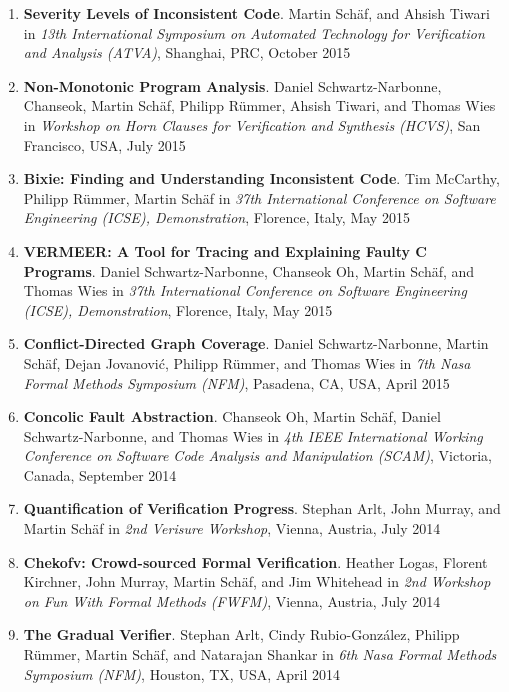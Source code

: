 \begin{enumerate}
\item \textbf{Severity Levels of Inconsistent Code}.
Martin Sch\"af, and Ahsish Tiwari in \emph{13th International
Symposium on Automated Technology for Verification and Analysis (ATVA)},
Shanghai, PRC, October 2015

\item \textbf{Non-Monotonic Program Analysis}.
Daniel Schwartz-Narbonne, Chanseok, Martin Sch\"af, Philipp R\"ummer, Ahsish
Tiwari, and Thomas Wies in \emph{Workshop on Horn Clauses for Verification and
Synthesis (HCVS)}, San Francisco, USA, July 2015


\item \textbf{Bixie: Finding and Understanding Inconsistent Code}.
Tim McCarthy, Philipp R\"ummer, Martin Sch\"af 
in \emph{37th International Conference on Software Engineering (ICSE),
Demonstration}, Florence, Italy, May 2015


\item \textbf{VERMEER: A Tool for Tracing and Explaining Faulty C Programs}.
Daniel Schwartz-Narbonne, Chanseok Oh, Martin Sch\"af, and Thomas Wies 
in \emph{37th International Conference on Software Engineering (ICSE),
Demonstration}, Florence, Italy, May 2015


\item \textbf{Conflict-Directed Graph Coverage}.
Daniel Schwartz-Narbonne, Martin Sch\"af, Dejan Jovanovi\'c, Philipp R\"ummer,
and Thomas Wies in \emph{7th Nasa Formal
Methods Symposium (NFM)}, Pasadena, CA, USA, April 2015


\item \textbf{Concolic Fault Abstraction}.  
Chanseok Oh, Martin Sch\"af, Daniel Schwartz-Narbonne, and Thomas Wies in
\emph{4th IEEE International Working Conference on Software Code Analysis and
Manipulation (SCAM)}, Victoria, Canada, September 2014

\item \textbf{Quantification of Verification Progress}.
Stephan Arlt, John Murray, and Martin Sch\"af in \emph{2nd Verisure Workshop},
Vienna, Austria, July 2014


\item \textbf{Chekofv: Crowd-sourced Formal Verification}.
Heather Logas, Florent Kirchner, John Murray, Martin Sch\"af, and Jim Whitehead
in \emph{2nd Workshop on Fun With Formal Methods (FWFM)}, Vienna, Austria, July
2014


\item \textbf{The Gradual Verifier}.
Stephan Arlt, Cindy Rubio-Gonz\'alez, Philipp R\"ummer,
Martin Sch\"af, and Natarajan Shankar in \emph{6th Nasa Formal Methods
Symposium (NFM)}, Houston, TX, USA, April 2014



\end{enumerate}
